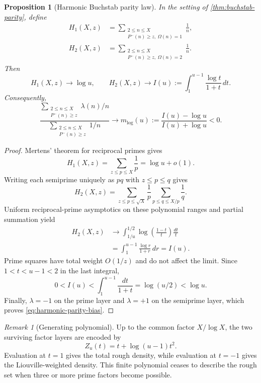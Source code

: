 \documentclass[11pt]{article}
\newtheorem{proposition}[theorem]{Proposition}
\theoremstyle{definition}
\theoremstyle{remark}
\newtheorem{remark}[theorem]{Remark}
\newcommand{\Om}{\Omega}
\begin{document}
\begin{proposition}[Harmonic Buchstab parity law]\label{prop:harmonic-buchstab}
In the setting of \cref{thm:buchstab-parity}, define
\begin{align}
 H_1(X,z)&=\sum_{\substack{2\le n\le X\\P^-(n)\ge z,\ \Om(n)=1}}\frac1n,
 \label{eq:harmonic-prime-layer}\\
 H_2(X,z)&=\sum_{\substack{2\le n\le X\\P^-(n)\ge z,\ \Om(n)=2}}\frac1n.
 \label{eq:harmonic-semiprime-layer}
\end{align}
Then
\begin{equation}\label{eq:harmonic-layer-limits}
 H_1(X,z)\longrightarrow\log u,
 \qquad
 H_2(X,z)\longrightarrow
 I(u):=\int_1^{u-1}\frac{\log t}{1+t}\,dt.
\end{equation}
Consequently,
\begin{equation}\label{eq:harmonic-parity-bias}
 \frac{\displaystyle
  \sum_{\substack{2\le n\le X\\P^-(n)\ge z}}\lambda(n)/n}
 {\displaystyle
  \sum_{\substack{2\le n\le X\\P^-(n)\ge z}}1/n}
 \longrightarrow
 m_{\log}(u):=\frac{I(u)-\log u}{I(u)+\log u}<0.
\end{equation}
\end{proposition}

\begin{proof}
Mertens' theorem for reciprocal primes gives
\[
 H_1(X,z)=\sum_{z\le p\le X}\frac1p=\log u+o(1).
\]
Writing each semiprime uniquely as $pq$ with $z\le p\le q$ gives
\[
 H_2(X,z)=
 \sum_{z\le p\le\sqrt X}\frac1p
 \sum_{p\le q\le X/p}\frac1q.
\]
Uniform reciprocal-prime asymptotics on these polynomial ranges and partial summation yield
\begin{align*}
 H_2(X,z)
 &\longrightarrow
 \int_{1/u}^{1/2}
 \log\!\left(\frac{1-t}{t}\right)\frac{dt}{t}\\
 &=\int_1^{u-1}\frac{\log r}{1+r}\,dr=I(u).
\end{align*}
Prime squares have total weight $O(1/z)$ and do not affect the limit.  Since $1<t<u-1<2$ in the last integral,
\[
 0<I(u)<\int_1^{u-1}\frac{dt}{1+t}=\log(u/2)<\log u.
\]
Finally, $\lambda=-1$ on the prime layer and $\lambda=+1$ on the semiprime layer, which proves \eqref{eq:harmonic-parity-bias}.
\end{proof}

\begin{remark}[Generating polynomial]\label{rem:buchstab-polynomial}
Up to the common factor $X/\log X$, the two surviving factor layers are encoded by
\begin{equation}\label{eq:buchstab-generating-polynomial}
 Z_u(t)=t+\log(u-1)t^2.
\end{equation}
Evaluation at $t=1$ gives the total rough density, while evaluation at $t=-1$ gives the Liouville-weighted density.  This finite polynomial ceases to describe the rough set when three or more prime factors become possible.
\end{remark}
\end{document}
